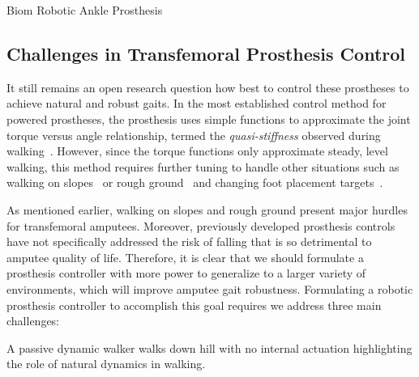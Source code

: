 \begin{marginfigure}[-1in]
    \centering
    \caption{Biom Robotic Ankle Prosthesis}
    \label{fig:biom_ankle}
\end{marginfigure}


\subsection{Challenges in Transfemoral Prosthesis
Control}\label{sec:intro_challenges} 

It still remains an open research question how best to control these prostheses
to achieve natural and robust gaits. In the most established control method for
powered prostheses, the prosthesis uses simple functions to approximate the
joint torque versus angle relationship, termed the \emph{quasi-stiffness}
observed during walking~\citep{sup2007design, lenzi2014speed}. However, since
the torque functions only approximate steady, level walking, this method
requires further tuning to handle other situations such as walking on
slopes~\citep{sup2011upslope} or rough ground~\citep{thatte2016toward} and
changing foot placement targets~\citep{schepelmann2016evaluation}. 

As mentioned earlier, walking on slopes and rough ground present major hurdles
for transfemoral amputees. Moreover, previously developed prosthesis controls
have not specifically addressed the risk of falling that is so detrimental to
amputee quality of life. Therefore, it is clear that we should formulate a
prosthesis controller with more power to generalize to a larger variety of
environments, which will improve amputee gait robustness. Formulating a robotic
prosthesis controller to accomplish this goal requires we address three main
challenges:

\begin{marginfigure}
    \centering
    \caption{A passive dynamic walker walks down hill with no internal
    actuation highlighting the role of natural dynamics in walking.}
    \label{fig:passive_dynamic_walker}
\end{marginfigure}

